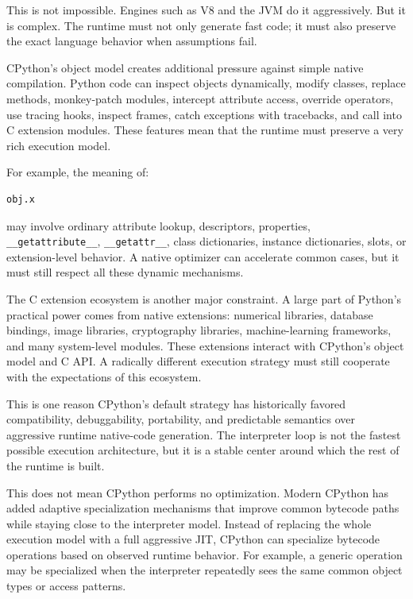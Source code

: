This is not impossible. Engines such as V8 and the JVM do it aggressively. But it is complex. The runtime must not only generate fast code; it must also preserve the exact language behavior when assumptions fail.

CPython's object model creates additional pressure against simple native compilation. Python code can inspect objects dynamically, modify classes, replace methods, monkey-patch modules, intercept attribute access, override operators, use tracing hooks, inspect frames, catch exceptions with tracebacks, and call into C extension modules. These features mean that the runtime must preserve a very rich execution model.

For example, the meaning of:

\begin{verbatim}
obj.x
\end{verbatim}

may involve ordinary attribute lookup, descriptors, properties, \texttt{\_\_getattribute\_\_}, \texttt{\_\_getattr\_\_}, class dictionaries, instance dictionaries, slots, or extension-level behavior. A native optimizer can accelerate common cases, but it must still respect all these dynamic mechanisms.

The C extension ecosystem is another major constraint. A large part of Python's practical power comes from native extensions: numerical libraries, database bindings, image libraries, cryptography libraries, machine-learning frameworks, and many system-level modules. These extensions interact with CPython's object model and C API. A radically different execution strategy must still cooperate with the expectations of this ecosystem.

This is one reason CPython's default strategy has historically favored compatibility, debuggability, portability, and predictable semantics over aggressive runtime native-code generation. The interpreter loop is not the fastest possible execution architecture, but it is a stable center around which the rest of the runtime is built.

This does not mean CPython performs no optimization. Modern CPython has added adaptive specialization mechanisms that improve common bytecode paths while staying close to the interpreter model. Instead of replacing the whole execution model with a full aggressive JIT, CPython can specialize bytecode operations based on observed runtime behavior. For example, a generic operation may be specialized when the interpreter repeatedly sees the same common object types or access patterns.

